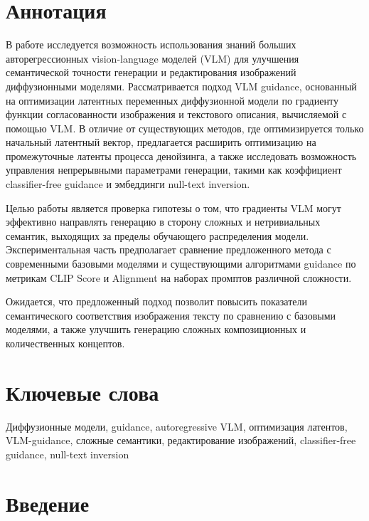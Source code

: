 \documentclass[a4paper,12pt]{extarticle}
\begin{document}
\newpage
\setcounter{page}{2}

{
	\hypersetup{linkcolor=black}
	\tableofcontents
}

\newpage

\newpage
\section*{Аннотация}   %
В работе исследуется возможность использования знаний больших авторегрессионных vision-language моделей (VLM) для улучшения семантической точности генерации и редактирования изображений диффузионными моделями. Рассматривается подход VLM guidance, основанный на оптимизации латентных переменных диффузионной модели по градиенту функции согласованности изображения и текстового описания, вычисляемой с помощью VLM. В отличие от существующих методов, где оптимизируется только начальный латентный вектор, предлагается расширить оптимизацию на промежуточные латенты процесса денойзинга, а также исследовать возможность управления непрерывными параметрами генерации, такими как коэффициент classifier-free guidance и эмбеддинги null-text inversion.

Целью работы является проверка гипотезы о том, что градиенты VLM могут эффективно направлять генерацию в сторону сложных и нетривиальных семантик, выходящих за пределы обучающего распределения модели. Экспериментальная часть предполагает сравнение предложенного метода с современными базовыми моделями и существующими алгоритмами guidance по метрикам CLIP Score и Alignment на наборах промптов различной сложности.

Ожидается, что предложенный подход позволит повысить показатели семантического соответствия изображения тексту по сравнению с базовыми моделями, а также улучшить генерацию сложных композиционных и количественных концептов.




\section*{Ключевые слова}
Диффузионные модели, guidance, autoregressive VLM, оптимизация латентов, VLM-guidance, сложные семантики, редактирование изображений, classifier-free guidance, null-text inversion
\pagebreak


\newpage
\section{Введение}











\newpage
\printbibliography[
  heading=bibintoc,
  sorting=none
]
\end{document}
